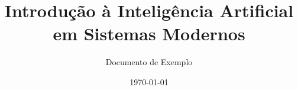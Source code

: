 \title{Introdução à Inteligência Artificial em Sistemas Modernos}
\author{Documento de Exemplo}
\date{\today}
 
\maketitle

\tableofcontents
   
\newpage  